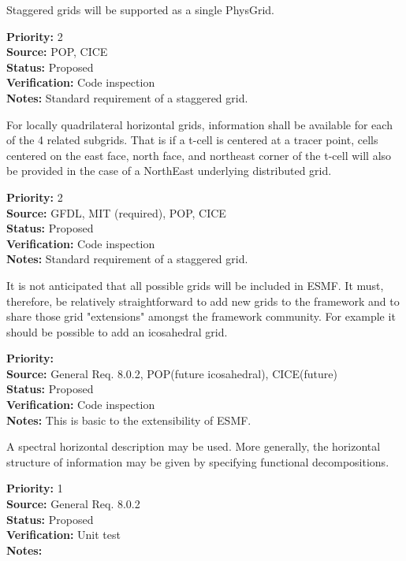 Staggered grids will be supported as a single PhysGrid.
\begin{reqlist}
{\bf Priority:} 2 \\
{\bf Source:} POP, CICE \\
{\bf Status:} Proposed \\
{\bf Verification:} Code inspection\\
{\bf Notes:} Standard requirement of a staggered grid.
\end{reqlist}

For locally quadrilateral horizontal grids, information shall be available for
each of the 4 related subgrids.  That is if a t-cell is centered at a tracer
point,  cells centered on the east face, north face, and northeast corner of
the t-cell will also be provided in the case of a NorthEast underlying
distributed grid.
\begin{reqlist}
{\bf Priority:} 2 \\
{\bf Source:} GFDL, MIT (required), POP, CICE \\
{\bf Status:} Proposed \\
{\bf Verification:} Code inspection\\
{\bf Notes:} Standard requirement of a staggered grid.
\end{reqlist}

It is not anticipated that all possible grids will be included in
ESMF. It must, therefore, be relatively straightforward to add
new grids to the framework and to share those grid "extensions"
amongst the framework community. For example it should be possible
to add an icosahedral grid.
\begin{reqlist}
{\bf Priority:} \\
{\bf Source:} General Req. 8.0.2, POP(future icosahedral), CICE(future) \\
{\bf Status:} Proposed \\
{\bf Verification:} Code inspection \\
{\bf Notes:} This is basic to the extensibility of ESMF.
\end{reqlist}


A spectral horizontal description may be used.  More generally, the horizontal
structure of information may be given by specifying functional decompositions.
\begin{reqlist}
{\bf Priority:} 1 \\
{\bf Source:} General Req. 8.0.2  \\
{\bf Status:} Proposed \\
{\bf Verification:} Unit test\\
{\bf Notes:}
\end{reqlist}

